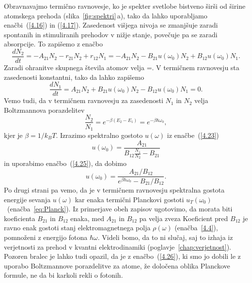 Obravnavajmo termično ravnovesje, ko je spekter svetlobe bistveno širši
od širine atomskega prehoda (slika~\ref{fig:spektri}\,a), tako da lahko
uporabljamo enačbi~(\ref{4.16}) in (\ref{4.17}). Zasedenost višjega nivoja
se zmanjšuje zaradi spontanih in stimuliranih prehodov v nižje
stanje, povečuje pa se zaradi absorpcije. To zapišemo z enačbo
\begin{equation}
\frac{dN_{2}}{dt}=-A_{21}N_2 - r_{21}N_2 + r_{12}N_1 = 
-A_{21}N_{2}-B_{21}u(\omega_{0})N_{2}+B_{12}u(\omega_{0})N_{1}.
\label{4.22}
\end{equation}
Zaradi ohranitve skupnega števila atomov velja 
\beq
{}=.
\eeq
V termičnem ravnovesju sta zasedenosti konstantni, tako da lahko zapišemo 
\begin{equation}
\frac{dN_{1}}{dt}=A_{21}N_{2}+B_{21}u(\omega_{0})N_{2}-B_{12}u(\omega_{0})N_{1}=0.
\label{4.23}
\end{equation}
Vemo tudi, da v termičnem ravnovesju za zasedenosti $N_{1}$ in $N_{2}$ velja
Boltzmannova porazdelitev
\begin{equation}
\frac{N_{2}}{N_{1}}=e^{-\beta(E_{2}-E_{1})} = e^{-\beta \hbar \omega_0},
\label{4.25}
\end{equation}
kjer je $\beta=1/k_BT$. Izrazimo spektralno gostoto $u(\omega)$ 
iz enačbe~(\ref{4.23})
\begin{equation}
u(\omega_{0})=\frac{A_{21}}{B_{12}\frac{N_{1}}{N_{2}}-B_{21}}
\label{4.24}
\end{equation}
in uporabimo enačbo~(\ref{4.25}), da dobimo
\begin{equation}
u(\omega_{0})=\frac{A_{21}/B_{12}}{e^{\beta\hbar\omega_{0}}-B_{21}/B_{12}}.
\label{4.26}
\end{equation}
Po drugi strani pa vemo, da je v termičnem ravnovesju spektralna gostota energije sevanja
$u(\omega)$ kar enaka termični Planckovi gostoti $u_{T}(\omega_{0})$~(enačba~\ref{eq:Planck}).
Iz primerjave obeh zapisov ugotovimo, da morata biti koeficienta $B_{21}$ in $B_{12}$ enaka,
med $A_{21}$ in $B_{12}$ pa velja zveza 
Koeficient pred $B_{12}$ je ravno enak gostoti stanj elektromagnetnega polja 
$\rho(\omega)$ (enačba~\ref{4.4}), pomnoženi z energijo fotona $\hbar\omega$. 
Videli bomo, da to ni slučaj, saj to izhaja iz verjetnosti za prehod v kvantni 
elektrodinamiki (poglavje~\ref{chap:verjetnost}).
Pozoren bralec je lahko tudi opazil, da je z enačbo~(\ref{4.26}),
ki smo jo dobili le z uporabo Boltzmannove porazdelitve za atome, že
določena oblika Planckove formule, ne da bi karkoli rekli o fotonih.

